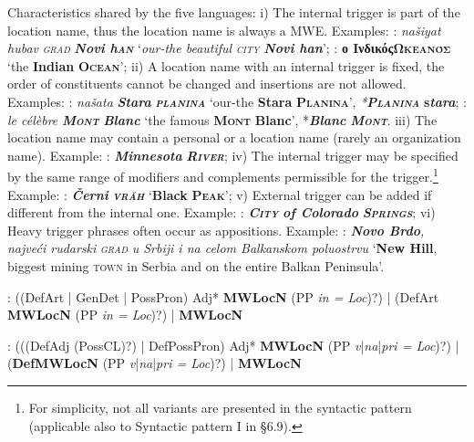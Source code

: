 \documentclass[output=paper]{langsci/langscibook}
\newcommand{\trigger}[1]{\textsc{#1}}
\begin{document}
Characteristics shared by the five languages: i) The internal trigger is
part of the location name, thus the location name is always a MWE.
Examples: : \textit{našiyat hubav }\textit{\trigger{grad}}
\textbf{\textit{Novi h}}\textbf{\textit{\trigger{an}}} ‘\textit{our-the
beautiful }\textit{\trigger{city}} \textbf{\textit{Novi han}}’; :
\textbf{ο Ινδικός}\textbf{\trigger{Ωκεανός}} ‘the
\textbf{Indian }\textbf{\trigger{Ocean}}’; ii) A location name with an
internal trigger is fixed, the order of constituents cannot be changed
and insertions are not allowed. Examples: : \textit{našata
}\textbf{\textit{Stara }}\textbf{\textit{\trigger{planina}}} ‘our-the
\textbf{Stara }\textbf{\trigger{Planina}}’,
\textit{*}\textbf{\textit{\trigger{Planina}}}
\textbf{s}\textbf{\textit{tara}}; : \textit{le célèbre
}\textbf{\textit{\trigger{Mont}}} \textbf{\textit{Blanc}} ‘the famous
\textbf{\trigger{Mont}} \textbf{Blanc}’, *\textbf{\textit{Blanc
}}\textbf{\textit{\trigger{Mont}}}. iii) The location name may contain a
personal or a location name (rarely an organization name). Example: :
\textbf{\textit{Minnesota }}\textbf{\textit{\trigger{River}}}; iv) The
internal trigger may be specified by the same range of modifiers and
complements permissible for the
trigger.\footnote{For simplicity, not all variants are  presented in
the syntactic pattern (applicable also to Syntactic
pattern I in §6.9).} Example: : \textbf{\textit{Černi
}}\textbf{\textit{\trigger{vrăh}}} ‘\textbf{Black
}\textbf{\trigger{Peak}}’; v) External trigger can be added if different
from the internal one. Example: : \textbf{\textit{\trigger{City}}}
\textbf{\textit{of Colorado }}\textbf{\textit{\trigger{Springs}}}; vi)
Heavy trigger phrases often occur as appositions. Example: :
\textbf{\textit{Novo Brdo}}\textit{, najveći rudarski
}\textit{\trigger{grad}} \textit{u Srbiji i na celom Balkanskom
poluostrvu} ‘\textbf{New Hill}, biggest mining \trigger{town} in Serbia
and on the entire Balkan Peninsula’.



: ((DefArt | GenDet | PossPron) Adj* \textbf{MWLocN }(PP \textit{in =
Loc})?) | (DefArt \textbf{MWLocN }(PP \textit{in = Loc})?) |
\textbf{MWLocN}



: (((DefAdj (PossCL)?) | DefPossPron) Adj* \textbf{MWLocN} (PP \textit{v}|\textit{na}|\textit{pri = Loc})?) | (\textbf{DefMWLocN} (PP \textit{v}|\textit{na}|\textit{pri =
Loc})?) | \textbf{MWLocN}
\end{document}
